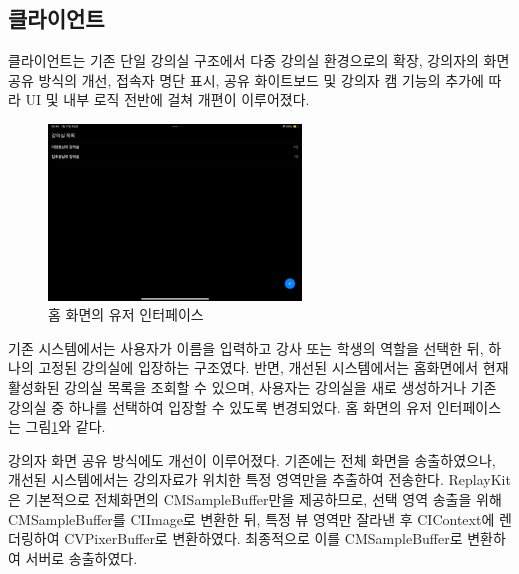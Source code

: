 \documentclass[10pt, a4paper, oneside]{article}
\begin{document}
\subsection{클라이언트}
클라이언트는 기존 단일 강의실 구조에서 다중 강의실 환경으로의 확장, 강의자의 화면 공유 방식의 개선, 접속자 명단 표시, 공유 화이트보드 및 강의자 캠 기능의 추가에 따라 UI 및 내부 로직 전반에 걸쳐 개편이 이루어졌다.
\newpage
\begin{figure}[htbp]
    \begin{center}
    \includegraphics[width=0.6\textwidth]{home.PNG}
    \caption{홈 화면의 유저 인터페이스}
    \label{fig:fig2}
    \end{center}
\end{figure}
기존 시스템에서는 사용자가 이름을 입력하고 강사 또는 학생의 역할을 선택한 뒤, 하나의 고정된 강의실에 입장하는 구조였다. 반면, 개선된 시스템에서는 홈화면에서 현재 활성화된 강의실 목록을 조회할 수 있으며, 사용자는 강의실을 새로 생성하거나 기존 강의실 중 하나를 선택하여 입장할 수 있도록 변경되었다. 홈 화면의 유저 인터페이스는 그림\ref{fig:fig2}와 같다.

강의자 화면 공유 방식에도 개선이 이루어졌다. 기존에는 전체 화면을 송출하였으나, 개선된 시스템에서는 강의자료가 위치한 특정 영역만을 추출하여 전송한다. ReplayKit은 기본적으로 전체화면의 CMSampleBuffer만을 제공하므로, 선택 영역 송출을 위해 CMSampleBuffer를 CIImage로 변환한 뒤, 특정 뷰 영역만 잘라낸 후 CIContext에 렌더링하여 CVPixerBuffer로 변환하였다. 최종적으로 이를 CMSampleBuffer로 변환하여 서버로 송출하였다.
\end{document}
